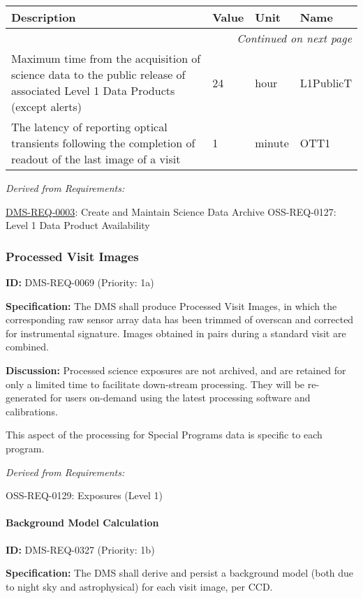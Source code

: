 \documentclass[SE,toc,lsstdraft]{lsstdoc}
\makeatletter
\newcommand{\paramname}[1]{\hspace{0pt}#1}
\newcommand{\unitname}[1]{\hspace{0pt}#1}
\newenvironment{parameters}[0]{%
\setlength\LTleft{0pt}
\setlength\LTright{\fill}
\begin{small}
\begin{longtable}[]{|p{0.49\textwidth}|l|p{0.6in}|p{1.70in}@{}|}

\hline \textbf{Description} & \textbf{Value} & \textbf{Unit} & \textbf{Name} \\ \hline
\endhead

\hline \multicolumn{4}{r}{\emph{Continued on next page}} \\
\endfoot

\hline\hline
\endlastfoot
}{%
\hline
\end{longtable}
\end{small}
}
\makeatother
\begin{document}
\begin{parameters}
Maximum time from the acquisition of science data to the public release of associated Level 1 Data Products (except alerts)
&
24
&
\unitname{%
hour
}
&
\paramname{%
L1PublicT
} \\\hline
The latency of reporting optical transients following the completion of readout of the last image of a visit
&
1
&
\unitname{%
minute
}
&
\paramname{%
OTT1
} \\\hline
\end{parameters}

\emph{Derived from Requirements:}

\hyperref[DMS-REQ-0003]{DMS-REQ-0003}:
Create and Maintain Science Data Archive \newline
OSS-REQ-0127:
Level 1 Data Product Availability \newline

\subsubsection{Processed Visit Images}

\label{DMS-REQ-0069}
\textbf{ID:} DMS-REQ-0069 (Priority: 1a)

\textbf{Specification: }The DMS shall produce Processed Visit Images, in which the corresponding raw sensor array data has been trimmed of overscan and corrected for instrumental signature. Images obtained in pairs during a standard visit are combined.

\textbf{Discussion:} Processed science exposures are not archived, and are retained for only a limited time to facilitate down-stream processing. They will be re-generated for users on-demand using the latest processing software and calibrations.

This aspect of the processing for Special Programs data is specific to each program.

\emph{Derived from Requirements:}

OSS-REQ-0129:
Exposures (Level 1) \newline

\paragraph{Background Model Calculation}\hfill  %

\label{DMS-REQ-0327}
\textbf{ID:} DMS-REQ-0327 (Priority: 1b)

\textbf{Specification: }The DMS shall derive and persist a background model (both due to night sky and astrophysical) for each visit image, per CCD.
\end{document}

